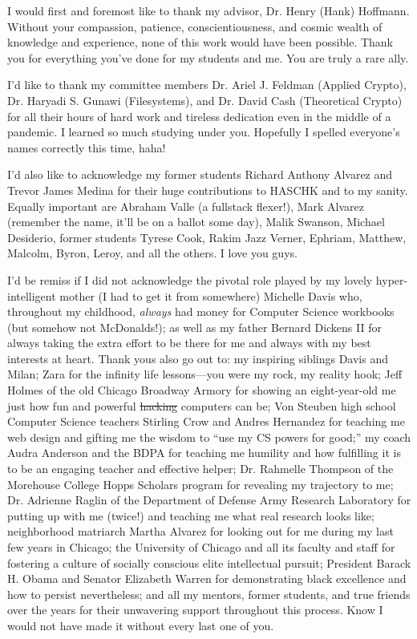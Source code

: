 \acknowledgments
I would first and foremost like to thank my advisor, Dr. Henry (Hank) Hoffmann.
Without your compassion, patience, conscientiousness, and cosmic wealth of
knowledge and experience, none of this work would have been possible. Thank you
for everything you've done for my students and me. You are truly a rare ally.

I'd like to thank my committee members Dr. Ariel J. Feldman (Applied Crypto),
Dr. Haryadi S. Gunawi (Filesystems), and Dr. David Cash (Theoretical Crypto) for
all their hours of hard work and tireless dedication even in the middle of a
pandemic. I learned so much studying under you. Hopefully I spelled everyone's
names correctly this time, haha!

I'd also like to acknowledge my former students Richard Anthony Alvarez and
Trevor James Medina for their huge contributions to HASCHK and to my sanity.
Equally important are Abraham Valle (a fullstack flexer!), Mark Alvarez
(remember the name, it'll be on a ballot some day), Malik Swanson, Michael
Desiderio, former students Tyrese Cook, Rakim Jazz Verner, Ephriam, Matthew,
Malcolm, Byron, Leroy, and all the others. I love you guys.

I'd be remiss if I did not acknowledge the pivotal role played by my lovely
hyper-intelligent mother (I had to get it from somewhere) Michelle Davis who,
throughout my childhood, \emph{always} had money for Computer Science workbooks
(but somehow not McDonalds!); as well as my father Bernard Dickens II for always
taking the extra effort to be there for me and always with my best interests at
heart. Thank yous also go out to: my inspiring siblings Davis and Milan; Zara
for the infinity life lessons---you were my rock, my reality hook; Jeff Holmes
of the old Chicago Broadway Armory for showing an eight-year-old me just how fun
and powerful \sout{hacking} computers can be; Von Steuben high school Computer
Science teachers Stirling Crow and Andres Hernandez for teaching me web design
and gifting me the wisdom to ``use my CS powers for good;'' my coach Audra
Anderson and the BDPA for teaching me humility and how fulfilling it is to be an
engaging teacher and effective helper; Dr. Rahmelle Thompson of the Morehouse
College Hopps Scholars program for revealing my trajectory to me; Dr. Adrienne
Raglin of the Department of Defense Army Research Laboratory for putting up with
me (twice!) and teaching me what real research looks like; neighborhood
matriarch Martha Alvarez for looking out for me during my last few years in
Chicago; the University of Chicago and all its faculty and staff for fostering a
culture of socially conscious elite intellectual pursuit; President Barack H.
Obama and Senator Elizabeth Warren for demonstrating black excellence and how to
persist nevertheless; and all my mentors, former students, and true friends over
the years for their unwavering support throughout this process. Know I would not
have made it without every last one of you.

